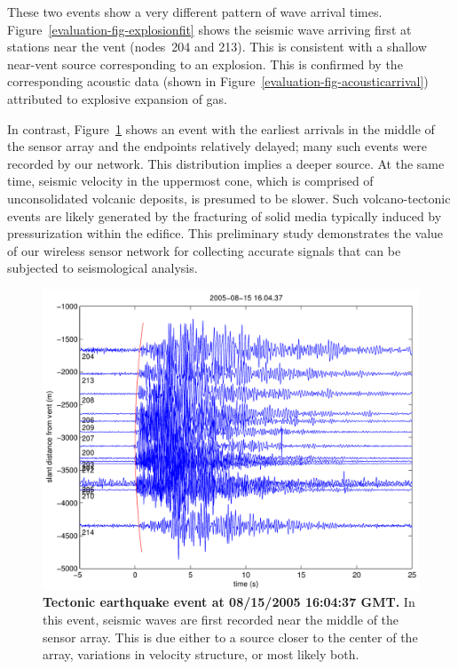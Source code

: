 These two events show a very different pattern of wave arrival times.
Figure~\ref{evaluation-fig-explosionfit} shows the seismic wave arriving
first at stations near the vent (nodes~204 and 213). This is consistent with
a shallow near-vent source corresponding to an explosion. This is confirmed
by the corresponding acoustic data (shown in
Figure~\ref{evaluation-fig-acousticarrival}) attributed to explosive
expansion of gas.

In contrast, Figure~\ref{evaluation-fig-tectonicfit} shows an event with the
earliest arrivals in the middle of the sensor array and the endpoints
relatively delayed; many such events were recorded by our network. This
distribution implies a deeper source. At the same time, seismic velocity in
the uppermost cone, which is comprised of unconsolidated volcanic deposits,
is presumed to be slower. Such volcano-tectonic events are likely generated
by the fracturing of solid media typically induced by pressurization within
the edifice. This preliminary study demonstrates the value of our wireless
sensor network for collecting accurate signals that can be subjected to
seismological analysis.

\begin{figure}[t!]
\begin{center}
\includegraphics[width=0.8\hsize]{./3-evaluation/figs/tectonicfit.pdf}
\end{center}

\caption{\textbf{Tectonic earthquake event at 08/15/2005 16:04:37 GMT.} In
this event, seismic waves are first recorded near the middle of the sensor
array. This is due either to a source closer to the center of the array,
variations in velocity structure, or most likely both.}

\label{evaluation-fig-tectonicfit}
\end{figure}
